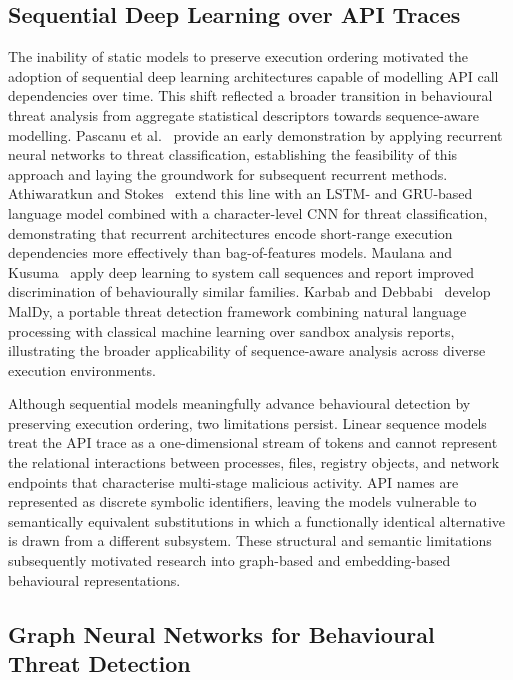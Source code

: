 \documentclass[%
    BCOR=10mm,
    DIV=13,
    toc=bibliography,
    toc=listof,
    oneside,
    12pt,
]{scrbook}
\begin{document}
\subsection{Sequential Deep Learning over API Traces}
\label{subsec:sequential_dl}

The inability of static models to preserve execution ordering motivated the
adoption of sequential deep learning architectures capable of modelling API
call dependencies over time. This shift reflected a broader transition in
behavioural threat analysis from aggregate statistical descriptors towards
sequence-aware modelling. Pascanu et al.~\cite{pascanu2015} provide an early
demonstration by applying recurrent neural networks to threat classification,
establishing the feasibility of this approach and laying the groundwork for
subsequent recurrent methods.
Athiwaratkun and Stokes~\cite{athiwaratkun2017} extend this line with an LSTM-
and GRU-based language model combined with a character-level CNN for threat
classification, demonstrating that recurrent architectures encode short-range
execution dependencies more effectively than bag-of-features models. Maulana and
Kusuma~\cite{nguyen2023} apply deep learning to system call sequences and report
improved discrimination of behaviourally similar families. Karbab and
Debbabi~\cite{karbab2019} develop MalDy, a portable threat detection framework
combining natural language processing with classical machine learning over
sandbox analysis reports, illustrating the broader applicability of
sequence-aware analysis across diverse execution environments.

Although sequential models meaningfully advance behavioural detection by
preserving execution ordering, two limitations persist. Linear sequence models
treat the API trace as a one-dimensional stream of tokens and cannot represent
the relational interactions between processes, files, registry objects, and
network endpoints that characterise multi-stage malicious activity. API names
are represented as discrete symbolic identifiers, leaving the models vulnerable
to semantically equivalent substitutions in which a functionally identical
alternative is drawn from a different subsystem. These structural and semantic
limitations subsequently motivated research into graph-based and
embedding-based behavioural representations.

\subsection{Graph Neural Networks for Behavioural Threat Detection}
\label{subsec:gnn}
\end{document}
